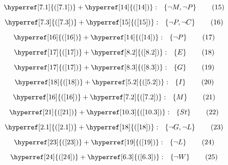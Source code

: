 \documentclass[a4paper]{article}
\newcommand{\refequation}[1]{\hyperref[#1]{(\ref{#1})}}
\begin{document}
\begin{equation}
\refequation{7.1} + \refequation{14}: \  \ \left\{ \lnot M , \lnot P \right\} \tag{15} \label{15}
\end{equation}

\begin{equation}
\refequation{7.3} + \refequation{15}: \  \ \left\{ \lnot P , \lnot C \right\} \tag{16} \label{16}
\end{equation}

\begin{equation}
\refequation{16} + \refequation{14}: \  \ \left\{ \lnot P\right\} \tag{17} \label{17}
\end{equation}

\begin{equation}
\refequation{17} + \refequation{8.2}: \  \ \left\{ E \right\} \tag{18} \label{18}
\end{equation}

\begin{equation}
\refequation{17} + \refequation{8.3}: \  \ \left\{ G \right\} \tag{19} \label{19}
\end{equation}

\begin{equation}
\refequation{18} + \refequation{5.2}: \  \ \left\{ I \right\} \tag{20} \label{20}
\end{equation}

\begin{equation}
\refequation{16} + \refequation{7.2}: \  \ \left\{ M \right\} \tag{21} \label{21}
\end{equation}

\begin{equation}
\refequation{21} + \refequation{10.3}: \  \ \left\{ St \right\} \tag{22} \label{22}
\end{equation}

\begin{equation}
\refequation{2.1} + \refequation{18}: \  \ \left\{ \lnot G , \lnot L \right\} \tag{23} \label{23}
\end{equation}

\begin{equation}
\refequation{23} + \refequation{19}: \  \ \left\{ \lnot L \right\} \tag{24} \label{24}
\end{equation}

\begin{equation}
\refequation{24} + \refequation{6.3}: \  \ \left\{ \lnot W \right\} \tag{25} \label{25}
\end{equation}
\end{document}
